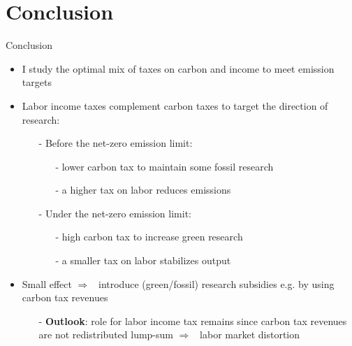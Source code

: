 \documentclass[11pt,aspectratio=169]{beamer}
\newcommand{\ar}{$\Rightarrow$ \ }
\begin{document}
\section{Conclusion}
\begin{frame}{Conclusion}
	\begin{itemize}[<+-| alert@+>]
		\item I study the optimal mix of taxes on carbon and income to meet emission targets
		\vspace{3mm}
		\item Labor income taxes complement carbon taxes to target the direction of research:
		\vspace{2mm}
		\begin{itemize}
			\item[-] Before the net-zero emission limit: 
			\begin{itemize}
				\item[-] lower carbon tax to maintain some fossil research
				\item[-] a higher tax on labor reduces emissions
			\end{itemize}
			\vspace{3mm}
			\item[-] Under the net-zero emission limit: 
			\begin{itemize}
				\item[-] high carbon tax to increase green research
				\item[-]  a smaller tax on labor stabilizes output
			\end{itemize}
		\end{itemize}
		\vspace{3mm}
		\item Small effect \ar introduce (green/fossil) research subsidies e.g. by using carbon tax revenues
		\vspace{2mm}
		
		\begin{itemize}
			\item[-] \textbf{Outlook}: role for labor income tax remains since carbon tax revenues are not redistributed lump-sum \ar labor market distortion
		\end{itemize}	
		
		
	\end{itemize}
\end{frame}
\end{document}
